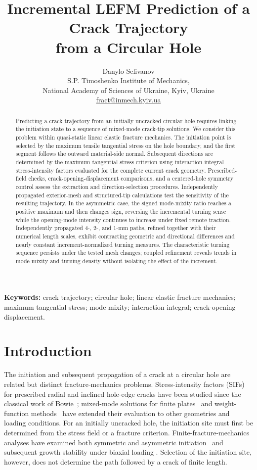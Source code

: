\documentclass[11pt]{article}
\title{Incremental LEFM Prediction of a Crack Trajectory\\from a Circular Hole}
\author{Danylo Selivanov\\[0.3em]
\small S.P. Timoshenko Institute of Mechanics,\\
\small National Academy of Sciences of Ukraine, Kyiv, Ukraine\\[0.2em]
\small \href{mailto:fract@inmech.kyiv.ua}{fract@inmech.kyiv.ua}}
\date{}
\begin{document}
\maketitle
\begin{abstract}
Predicting a crack trajectory from an initially uncracked circular hole
requires linking the initiation state to a sequence of mixed-mode
crack-tip solutions. We consider this problem within quasi-static linear
elastic fracture mechanics. The initiation point is selected by the
maximum tensile tangential stress on the hole boundary, and the
first segment follows the outward material-side normal. Subsequent
directions are determined by the maximum tangential stress criterion
using interaction-integral stress-intensity factors evaluated for the
complete current crack geometry. Prescribed-field checks,
crack-opening-displacement comparisons, and a centered-hole
symmetry control assess the extraction and direction-selection
procedures. Independently propagated exterior-mesh and
structured-tip calculations test the sensitivity of the resulting
trajectory. In the asymmetric case, the signed mode-mixity ratio
reaches a positive maximum and then changes sign, reversing the
incremental turning sense while the opening-mode intensity
continues to increase under fixed remote traction. Independently
propagated 4-, 2-, and 1-mm paths, refined together with their
numerical length scales, exhibit contracting geometric and
directional differences and nearly constant increment-normalized
turning measures. The characteristic turning sequence persists under the tested mesh
changes; coupled refinement reveals trends in mode mixity and
turning density without isolating the effect of the increment.
\end{abstract}
\noindent\textbf{Keywords:} crack trajectory; circular hole; linear elastic
fracture mechanics; maximum tangential stress; mode mixity; interaction
integral; crack-opening displacement.

\section{Introduction}
The initiation and subsequent propagation of a crack at a circular hole
are related but distinct fracture-mechanics problems. Stress-intensity
factors (SIFs) for prescribed radial and inclined hole-edge cracks have been
studied since the classical work of Bowie~\cite{Bowie1956}; mixed-mode
solutions for finite plates~\cite{WooWangCheung1989} and weight-function
methods~\cite{XuEtAl2018} have extended their evaluation to other
geometries and loading conditions. For an initially uncracked hole,
the initiation site must first be determined from the stress field or a
fracture criterion. Finite-fracture-mechanics analyses have examined
both symmetric and asymmetric initiation~\cite{SaporaEtAl2018} and
subsequent growth stability under biaxial loading
\cite{SaporaCornetti2018}. Selection of the initiation site, however,
does not determine the path followed by a crack of finite length.
\end{document}
